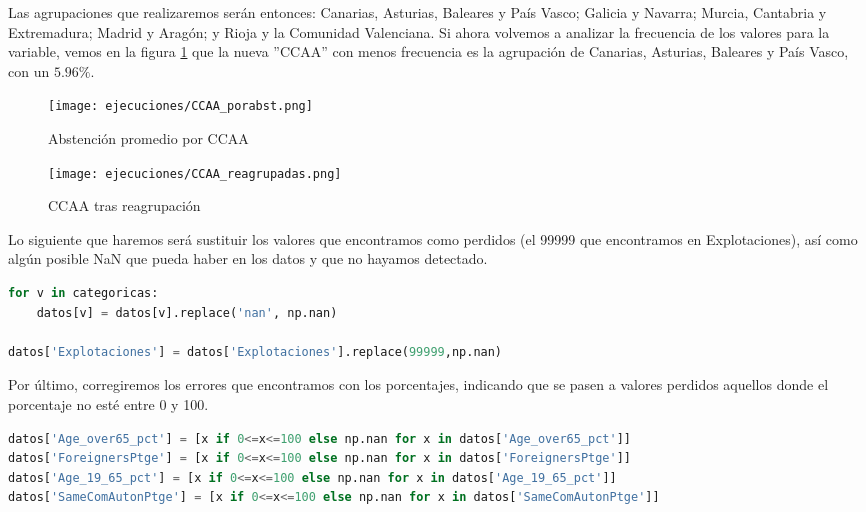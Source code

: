 \documentclass[a4paper,onecolumn]{extarticle}
\begin{document}
\begin{sloppypar}
Las agrupaciones que realizaremos serán entonces: Canarias, Asturias, Baleares y País Vasco; Galicia y Navarra; Murcia, Cantabria y Extremadura; Madrid y Aragón; 
y Rioja y la Comunidad Valenciana. Si ahora volvemos a analizar la frecuencia de los valores para la variable, vemos en la figura \ref{fig:CCAAreagrupada} que 
la nueva ''CCAA'' con menos frecuencia es la agrupación de Canarias, Asturias, Baleares y País Vasco, con un $5.96\%$.

\begin{figure}[h!]
    \centering
    \begin{minipage}{0.35\textwidth}
        \centering
        \texttt{[image: ejecuciones/CCAA\_porabst.png]}
        \caption{Abstención promedio por CCAA}
        \label{fig:CCAAbypct}
    \end{minipage}%
    \hspace{0.05\textwidth} %
    \begin{minipage}{0.35\textwidth}
        \centering
        \texttt{[image: ejecuciones/CCAA\_reagrupadas.png]}
        \caption{CCAA tras reagrupación}
        \label{fig:CCAAreagrupada}
    \end{minipage}
\end{figure}

Lo siguiente que haremos será sustituir los valores que encontramos como perdidos (el 99999 que encontramos en Explotaciones), así como algún posible NaN que
pueda haber en los datos y que no hayamos detectado.
\begin{lstlisting}[language=Python]
for v in categoricas:
    datos[v] = datos[v].replace('nan', np.nan)
    
datos['Explotaciones'] = datos['Explotaciones'].replace(99999,np.nan)
\end{lstlisting}

Por último, corregiremos los errores que encontramos con los porcentajes, indicando que se pasen a valores perdidos aquellos donde el porcentaje no esté
entre 0 y 100.
\begin{lstlisting}[language=Python]
datos['Age_over65_pct'] = [x if 0<=x<=100 else np.nan for x in datos['Age_over65_pct']]
datos['ForeignersPtge'] = [x if 0<=x<=100 else np.nan for x in datos['ForeignersPtge']]
datos['Age_19_65_pct'] = [x if 0<=x<=100 else np.nan for x in datos['Age_19_65_pct']]
datos['SameComAutonPtge'] = [x if 0<=x<=100 else np.nan for x in datos['SameComAutonPtge']]
\end{lstlisting}


\end{sloppypar}
\end{document}
